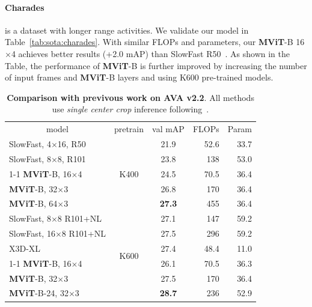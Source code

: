 \documentclass[10pt,twocolumn,letterpaper]{article}
\newcommand{\tblref}[1]{Table~\ref{#1}}
\def\x{$\times$}
\newcommand{\tablestyle}[2]{\setlength{\tabcolsep}{#1}\renewcommand{\arraystretch}{#2}\centering\footnotesize}
\begin{document}
\paragraph{Charades} \cite{Sigurdsson2016} is a dataset with longer range activities. We validate our model in \tblref{tab:sota:charades}. With similar FLOPs and parameters, our \textbf{MViT}-B 16\x4 achieves better results (+2.0 mAP) than SlowFast R50~\cite{Feichtenhofer2019}. As shown in the Table, the performance of \textbf{MViT}-B is further improved by increasing the number of input frames and \textbf{MViT}-B layers and using K600 pre-trained models.

\begin{table}[h!]
	\vspace{-15pt}
	\centering
	\tablestyle{2.5pt}{1.05}
	\begin{tabular}{l|c|c|r|r}
		\multicolumn{1}{c|}{model} & \multicolumn{1}{c|}{pretrain} &   val mAP  & FLOPs & Param \\ 
		\shline
		{SlowFast}, 4\x16, R50 \cite{Feichtenhofer2019} & \multirow{5}{*}{K400} & 21.9 & 52.6 & 33.7 \\ 
		SlowFast, 8\x8, R101~\cite{Feichtenhofer2019}   &  & 23.8  & 138 & 53.0 \\ 
		\cline{1-1} \cline{3-5}
		\textbf{MViT}-B, 16\x4   &  & 24.5 & 70.5 & 36.4 \\ 
		\textbf{MViT}-B, 32\x3    &   & 26.8 & 170 & 36.4 \\  
		\textbf{MViT}-B, 64\x3    &   & \textbf{27.3} & 455 & 36.4 \\  
		\shline
		
		{SlowFast}, 8\x8 R101+NL \cite{Feichtenhofer2019}   & \multirow{6}{*}{K600}   &  27.1 & 147 & 59.2 \\ 
		{SlowFast}, 16\x8 R101+NL \cite{Feichtenhofer2019}   &    &  27.5 & 296 & 59.2 \\
		X3D-XL~\cite{feichtenhofer2020x3d}  &    &  27.4 & 48.4 & 11.0 \\
		\cline{1-1} \cline{3-5}
		\textbf{MViT}-B, 16\x4   &  & 26.1 & 70.5 & 36.3 \\ 
		\textbf{MViT}-B, 32\x3    &   & 27.5 & 170 & 36.4 \\ 
		\textbf{MViT}-B-24, 32\x3    &   & \textbf{28.7} & 236& 52.9 \\  
		
	\end{tabular}
	
	\caption{\textbf{Comparison with previvous work on AVA v2.2}. All methods use \textit{single center crop} inference following~\cite{feichtenhofer2020x3d}.
	}
	\label{suptab:sota:ava}
	\vspace{-.5em}
\end{table}
\end{document}
